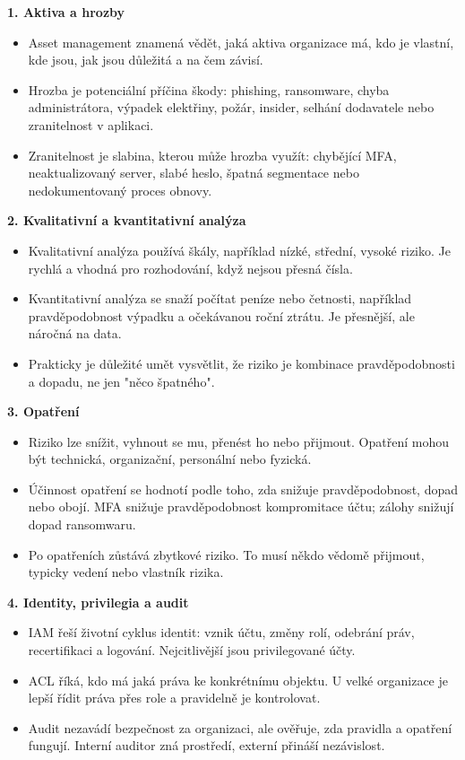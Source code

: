 \documentclass[11pt,a4paper]{article}
\begin{document}
\textbf{1. Aktiva a hrozby}
\begin{itemize}
  \item Asset management znamená vědět, jaká aktiva organizace má, kdo je vlastní, kde jsou, jak jsou důležitá a na čem závisí.
  \item Hrozba je potenciální příčina škody: phishing, ransomware, chyba administrátora, výpadek elektřiny, požár, insider, selhání dodavatele nebo zranitelnost v aplikaci.
  \item Zranitelnost je slabina, kterou může hrozba využít: chybějící MFA, neaktualizovaný server, slabé heslo, špatná segmentace nebo nedokumentovaný proces obnovy.
\end{itemize}

\textbf{2. Kvalitativní a kvantitativní analýza}
\begin{itemize}
  \item Kvalitativní analýza používá škály, například nízké, střední, vysoké riziko. Je rychlá a vhodná pro rozhodování, když nejsou přesná čísla.
  \item Kvantitativní analýza se snaží počítat peníze nebo četnosti, například pravděpodobnost výpadku a očekávanou roční ztrátu. Je přesnější, ale náročná na data.
  \item Prakticky je důležité umět vysvětlit, že riziko je kombinace pravděpodobnosti a dopadu, ne jen "něco špatného".
\end{itemize}

\textbf{3. Opatření}
\begin{itemize}
  \item Riziko lze snížit, vyhnout se mu, přenést ho nebo přijmout. Opatření mohou být technická, organizační, personální nebo fyzická.
  \item Účinnost opatření se hodnotí podle toho, zda snižuje pravděpodobnost, dopad nebo obojí. MFA snižuje pravděpodobnost kompromitace účtu; zálohy snižují dopad ransomwaru.
  \item Po opatřeních zůstává zbytkové riziko. To musí někdo vědomě přijmout, typicky vedení nebo vlastník rizika.
\end{itemize}

\textbf{4. Identity, privilegia a audit}
\begin{itemize}
  \item IAM řeší životní cyklus identit: vznik účtu, změny rolí, odebrání práv, recertifikaci a logování. Nejcitlivější jsou privilegované účty.
  \item ACL říká, kdo má jaká práva ke konkrétnímu objektu. U velké organizace je lepší řídit práva přes role a pravidelně je kontrolovat.
  \item Audit nezavádí bezpečnost za organizaci, ale ověřuje, zda pravidla a opatření fungují. Interní auditor zná prostředí, externí přináší nezávislost.
\end{itemize}
\end{document}
